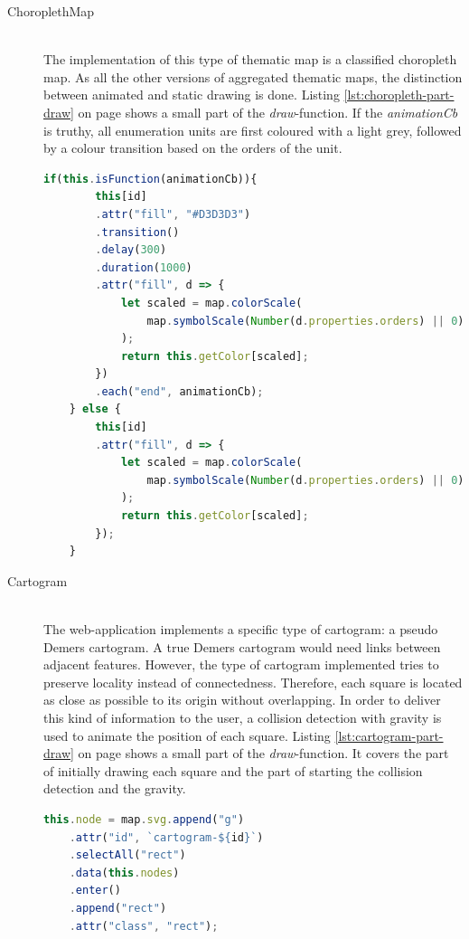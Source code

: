 \begin{description}
\item[ChoroplethMap] \hfill \\
The implementation of this type of thematic map is a classified choropleth map. As all the other versions of aggregated thematic maps, the distinction between animated and static drawing is done. Listing \ref{lst:choropleth-part-draw} on page \pageref{lst:choropleth-part-draw} shows a small part of the \textit{draw}-function. If the \textit{animationCb} is truthy, all enumeration units are first coloured with a light grey, followed by a colour transition based on the orders of the unit.

\begin{lstlisting}[language=JavaScript, caption={A small part of the draw-function of the ChoroplethMap-class}, label={lst:choropleth-part-draw}]
    if(this.isFunction(animationCb)){
        this[id]
        .attr("fill", "#D3D3D3")
        .transition()
        .delay(300)
        .duration(1000)
        .attr("fill", d => {
            let scaled = map.colorScale(
                map.symbolScale(Number(d.properties.orders) || 0) || 0
            );
            return this.getColor[scaled];
        })
        .each("end", animationCb);
    } else {
        this[id]
        .attr("fill", d => {
            let scaled = map.colorScale(
                map.symbolScale(Number(d.properties.orders) || 0) || 0
            );
            return this.getColor[scaled];
        });
    }
\end{lstlisting}


\item[Cartogram] \hfill \\
The web-application implements a specific type of cartogram: a pseudo Demers cartogram. A true Demers cartogram would need links between adjacent features. However, the type of cartogram implemented tries to preserve locality instead of connectedness. Therefore, each square is located as close as possible to its origin without overlapping. In order to deliver this kind of information to the user, a collision detection with gravity is used to animate the position of each square. Listing \ref{lst:cartogram-part-draw} on page \pageref{lst:cartogram-part-draw} shows a small part of the \textit{draw}-function. It covers the part of initially drawing each square and the part of starting the collision detection and the gravity.

\begin{lstlisting}[language=JavaScript, caption={A small part of the draw-function of the pseudo Demers Cartogramm-class}, label={lst:cartogram-part-draw}]
    this.node = map.svg.append("g")
    .attr("id", `cartogram-${id}`)
    .selectAll("rect")
    .data(this.nodes)
    .enter()
    .append("rect")
    .attr("class", "rect");


\end{lstlisting}
\end{description}
